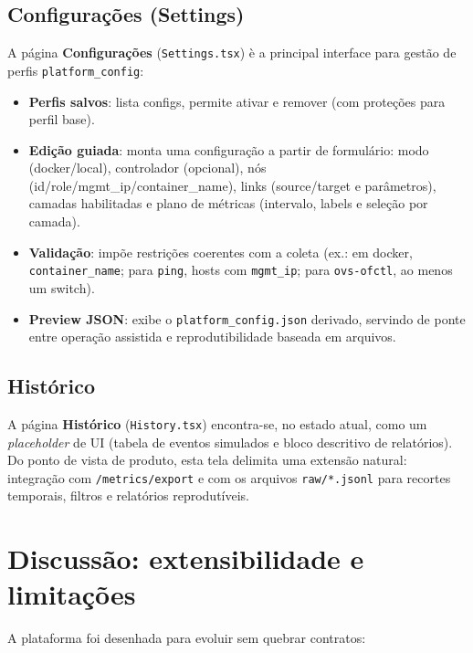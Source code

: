 \documentclass[12pt,oneside]{report}
\begin{document}
\subsection{Configura\c{c}\~oes (Settings)}
A p\'agina \textbf{Configura\c{c}\~oes} (\texttt{Settings.tsx}) \`e a principal interface para gest\~ao de perfis \texttt{platform\_config}:

\begin{itemize}
\item \textbf{Perfis salvos}: lista configs, permite ativar e remover (com prote\c{c}\~oes para perfil base).
\item \textbf{Edi\c{c}\~ao guiada}: monta uma configura\c{c}\~ao a partir de formul\'ario: modo (docker/local), controlador (opcional), n\'os (id/role/mgmt\_ip/container\_name), links (source/target e par\^ametros), camadas habilitadas e plano de m\'etricas (intervalo, labels e sele\c{c}\~ao por camada).
\item \textbf{Valida\c{c}\~ao}: imp\~oe restri\c{c}\~oes coerentes com a coleta (ex.: em docker, \texttt{container\_name}; para \texttt{ping}, hosts com \texttt{mgmt\_ip}; para \texttt{ovs-ofctl}, ao menos um switch).
\item \textbf{Preview JSON}: exibe o \texttt{platform\_config.json} derivado, servindo de ponte entre opera\c{c}\~ao assistida e reprodutibilidade baseada em arquivos.
\end{itemize}

\subsection{Hist\'orico}
A p\'agina \textbf{Hist\'orico} (\texttt{History.tsx}) encontra-se, no estado atual, como um \textit{placeholder} de UI (tabela de eventos simulados e bloco descritivo de relat\'orios). Do ponto de vista de produto, esta tela delimita uma extens\~ao natural: integra\c{c}\~ao com \texttt{/metrics/export} e com os arquivos \texttt{raw/*.jsonl} para recortes temporais, filtros e relat\'orios reprodut\'iveis.

\section{Discuss\~ao: extensibilidade e limita\c{c}\~oes}
A plataforma foi desenhada para evoluir sem quebrar contratos:
\end{document}
